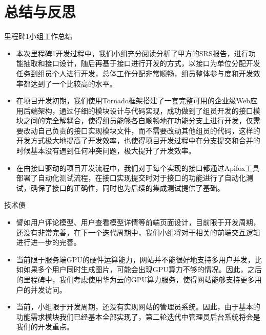 %
%
%
%
\section{总结与反思}
\begin{frame}{里程碑1小组工作总结}
    \begin{itemize}
        \item 本次里程碑1开发过程中，我们小组充分阅读分析了甲方的SRS报告，进行功能抽取和接口设计，随后再基于接口进行开发的方式，以接口为单位分配开发任务到组员个人进行开发，总体工作分配非常顺畅，组员整体参与度和开发效率都达到了一个比较高的水平。
        \item 在项目开发初期，我们使用Tornado框架搭建了一套完整可用的企业级Web应用后端架构，通过仔细的模块设计与代码实现，成功做到了组员开发的接口模块之间的完全解耦合，使得组员能够各自顺畅地在功能分支上进行开发，仅需要改动自己负责的接口实现模块文件，而不需要改动其他组员的代码，这样的开发方式极大地提高了开发效率，也使得项目开发过程中在分支提交和合并的时候基本没有遇到任何冲突问题，极大提升了开发效率。
        \item 在由接口驱动的项目开发流程中，我们对于每个实现的接口都通过Apifox工具部署了自动化测试流程，在接口实现提交时对于接口的功能进行了自动化测试，确保了接口的正确性，同时也为后续的集成测试提供了基础。
    \end{itemize}
\end{frame}

\begin{frame}{技术债}
    \begin{itemize}
        \item 譬如用户评论模型、用户查看模型详情等前端页面设计，目前限于开发周期，还没有非常完善，在下一个迭代周期中，我们小组将对于相关的前端交互逻辑进行进一步的完善。
        \item 当前限于服务端GPU的硬件运算能力，网站并不能很好地支持多用户并发，比如如果多个用户同时生成图片，可能会出现GPU算力不够的情况。因此，之后的里程碑中，我们考虑使用华为云的GPU算力服务，使得网站能够支持更多用户的并发访问。
        \item 当前，小组限于开发周期，还没有实现网站的管理员系统。因此，由于基本的功能需求模块我们已经基本全部实现了，第二轮迭代中管理员后台系统将会是我们的开发重点。
    \end{itemize}
\end{frame}

